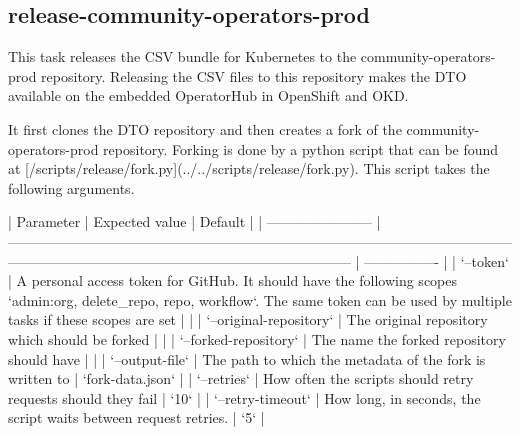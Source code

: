 \subsection{release-community-operators-prod}\label{subsec:release-community-operators-prod}

This task releases the CSV bundle for Kubernetes to the community-operators-prod repository.
Releasing the CSV files to this repository makes the DTO available on the embedded OperatorHub in OpenShift and OKD.

It first clones the DTO repository and then creates a fork of the community-operators-prod repository.
Forking is done by a python script that can be found at [/scripts/release/fork.py](../../scripts/release/fork.py).
This script takes the following arguments.

| Parameter               | Expected value                                                                                                                                                                         | Default          |
| ----------------------- | -------------------------------------------------------------------------------------------------------------------------------------------------------------------------------------- | ---------------- |
| `--token`               | A personal access token for GitHub. It should have the following scopes `admin:org, delete_repo, repo, workflow`. The same token can be used by multiple tasks if these scopes are set |                  |
| `--original-repository` | The original repository which should be forked                                                                                                                                         |                  |
| `--forked-repository`   | The name the forked repository should have                                                                                                                                             |                  |
| `--output-file`         | The path to which the metadata of the fork is written to                                                                                                                               | `fork-data.json` |
| `--retries`             | How often the scripts should retry requests should they fail                                                                                                                           | `10`             |
| `--retry-timeout`       | How long, in seconds, the script waits between request retries.                                                                                                                        | `5`              |


